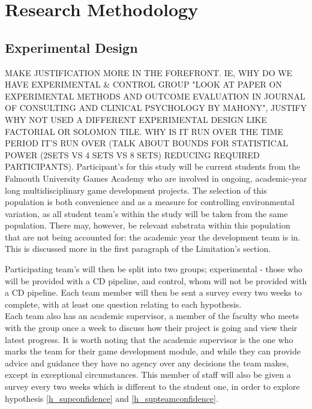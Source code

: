 \documentclass[journal]{IEEEtran}
\begin{document}

\section{Research Methodology}
\subsection{Experimental Design}
MAKE JUSTIFICATION MORE IN THE FOREFRONT. IE, WHY DO WE HAVE EXPERIMENTAL \& CONTROL GROUP "LOOK AT PAPER ON EXPERIMENTAL METHODS AND OUTCOME EVALUATION IN JOURNAL OF CONSULTING AND CLINICAL PSYCHOLOGY BY MAHONY", JUSTIFY WHY NOT USED A DIFFERENT EXPERIMENTAL DESIGN LIKE FACTORIAL OR SOLOMON TILE. WHY IS IT RUN OVER THE TIME PERIOD IT'S RUN OVER (TALK ABOUT BOUNDS FOR STATISTICAL POWER (2SETS VS 4 SETS VS 8 SETS) REDUCING REQUIRED PARTICIPANTS).
Participant's for this study will be current students from the Falmouth University Games Academy who are involved in ongoing, academic-year long multidisciplinary game development projects. The selection of this population is both convenience and as a measure for controlling environmental variation, as all student team's within the study will be taken from the same population. There may, however, be relevant substrata within this population that are not being accounted for: the academic year the development team is in. This is discussed more in the first paragraph of the Limitation's section.

Participating team's will then be split into two groups; experimental - those who will be provided with a CD pipeline, and control, whom will not be provided with a CD pipeline. Each team member will then be sent a survey every two weeks to complete, with at least one question relating to each hypothesis. \\
Each team also has an academic supervisor, a member of the faculty who meets with the group once a week to discuss how their project is going and view their latest progress. It is worth noting that the academic supervisor is the one who marks the team for their game development module, and while they can provide advice and guidance they have no agency over any decisions the team makes, except in exceptional circumstances. This member of staff will also be given a survey every two weeks which is different to the student one, in order to explore hypothesis \ref{h_supconfidence} and \ref{h_supteamconfidence}.
\end{document}
